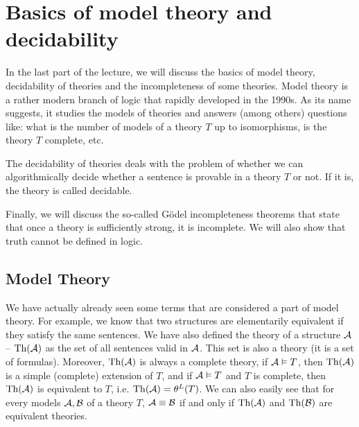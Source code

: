 
\chapter{Basics of model theory and decidability}

In the last part of the lecture, we will discuss the basics of model theory, decidability of theories and the incompleteness of some theories. Model theory is a rather modern branch of logic that rapidly developed in the 1990s. As its name suggests, it studies the models of theories and answers (among others) questions like: what is the number of models of a theory $T$ up to isomorphisms, is the theory $T$ complete, etc.

The decidability of theories deals with the problem of whether we can algorithmically decide whether a sentence is provable in a theory $T$ or not. If it is, the theory is called decidable.

Finally, we will discuss the so-called Gödel incompleteness theorems that state that once a theory is sufficiently strong, it is incomplete. We will also show that truth cannot be defined in logic.

\section{Model Theory}

We have actually already seen some terms that are considered a part of model theory. For example, we know that two structures are elementarily equivalent if they satisfy the same sentences. We have also defined the theory of a structure $\mathcal{A}$ -- $\operatorname{Th}(\mathcal{A})$ as the set of all sentences valid in $\mathcal{A}$. This set is also a theory (it is a set of formulas). Moreover, $\operatorname{Th}(\mathcal{A})$ is always a complete theory, if $\mathcal{A} \vDash T$, then $\operatorname{Th}(\mathcal{A})$ is a simple (complete) extension of $T$, and if $\mathcal{A} \vDash T$ and $T$ is complete, then $\operatorname{Th}(\mathcal{A})$ is equivalent to $T$, i.e. $\operatorname{Th}(\mathcal{A}) = \theta^L(T)$. We can also easily see that for every models $\mathcal{A}, \mathcal{B}$ of a theory $T$, $\mathcal{A} \equiv \mathcal{B}$ if and only if $\operatorname{Th}(\mathcal{A})$ and $\operatorname{Th}(\mathcal{B})$ are equivalent theories.

